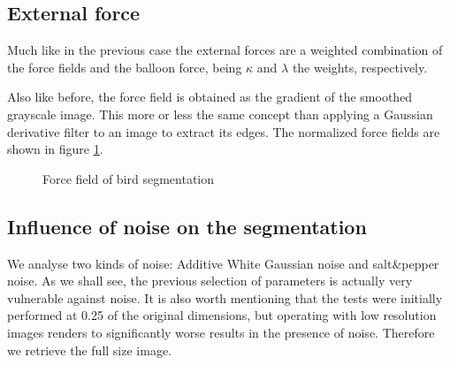 \subsection{External force}

Much like in the previous case the external forces are a weighted combination of the force fields and the balloon force, being $\kappa$ and $\lambda$ the weights, respectively.

Also like before, the force field is obtained as the gradient of the smoothed grayscale image. This more or less the same concept than applying a Gaussian derivative filter to an image to extract its edges. The normalized force fields are shown in figure \ref{fig:bird-ff}.

\begin{figure}[!hbt]
\centering   
{}
\caption{Force field of bird segmentation}
\label{fig:bird-ff}
\end{figure}

\subsection{Influence of noise on the segmentation}

We analyse two kinds of noise: Additive White Gaussian noise and salt\&pepper noise. As we shall see, the previous selection of parameters is actually very vulnerable against noise. It is also worth mentioning that the tests were initially performed at 0.25 of the original dimensions, but operating with low resolution images renders to significantly worse results in the presence of noise. Therefore we retrieve the full size image.

